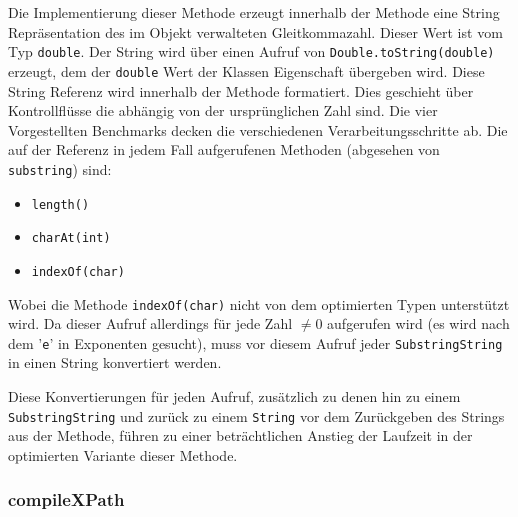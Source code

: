 Die Implementierung dieser Methode erzeugt innerhalb der Methode eine String Repräsentation des
im Objekt verwalteten Gleitkommazahl. Dieser Wert ist vom Typ \texttt{double}. Der 
String wird über einen Aufruf von \texttt{Double.toString(double)} erzeugt, dem der 
\texttt{double} Wert der Klassen Eigenschaft übergeben wird. Diese String Referenz wird innerhalb der 
Methode formatiert. Dies geschieht über Kontrollflüsse die abhängig von der ursprünglichen Zahl sind.
Die vier Vorgestellten Benchmarks decken die verschiedenen Verarbeitungsschritte ab. Die auf der
Referenz in jedem Fall aufgerufenen Methoden (abgesehen von \texttt{substring}) sind:

\begin{itemize}
	\item \texttt{length()}
	\item \texttt{charAt(int)}
	\item \texttt{indexOf(char)}
\end{itemize}

Wobei die Methode \texttt{indexOf(char)} nicht von dem optimierten Typen unterstützt wird.
Da dieser Aufruf allerdings für jede Zahl $\neq 0$ aufgerufen wird (es wird nach dem '\texttt{e}' in
Exponenten gesucht), muss vor diesem Aufruf jeder \texttt{SubstringString} in einen String
konvertiert werden. 

Diese Konvertierungen für jeden Aufruf, zusätzlich zu denen hin zu einem \texttt{SubstringString}
und zurück zu einem \texttt{String} vor dem Zurückgeben des Strings aus der Methode, führen zu 
einer beträchtlichen Anstieg der Laufzeit in der optimierten Variante dieser Methode.


\subsubsection{compileXPath}